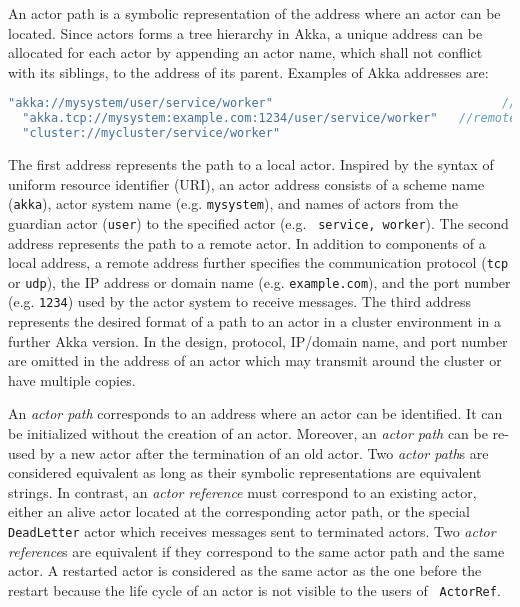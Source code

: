 An actor path is a symbolic representation of the address where an actor can be 
located.  Since actors forms a tree hierarchy in Akka, a unique address can be 
allocated for each actor by appending an actor name, which shall not conflict 
with its siblings, to the address of its parent.   Examples of Akka addresses 
are:

\begin{lstlisting}[language=scala]
  "akka://mysystem/user/service/worker"                                //local
  "akka.tcp://mysystem:example.com:1234/user/service/worker"   //remote
  "cluster://mycluster/service/worker"                                 //cluster
\end{lstlisting}

The first address represents the path to a local actor.  Inspired by the syntax 
of uniform resource identifier (URI), an actor address consists of a 
scheme name ({\tt akka}), actor system name (e.g. {\tt mysystem}), and names of 
actors from the guardian actor ({\tt user}) to the specified actor (e.g. {\tt 
service, worker}).  The second address represents the path to a remote actor.  
In addition to components of a local address, a remote address further 
specifies the communication protocol ({\tt tcp} or {\tt udp}), the IP address 
or domain name (e.g. {\tt example.com}), and the port number (e.g. {\tt 1234}) 
used by the actor system to receive messages. The third address represents the 
desired format of a path to an actor in a cluster environment in a further Akka 
version.  In the design,  protocol, IP/domain name, and port number are omitted 
in the address of an actor which may transmit around the cluster or have 
multiple copies.

An {\it actor path} corresponds to an address where an actor can be identified. 
It can be initialized without the creation of an actor.  Moreover, an {\it 
actor path} can be re-used by a new actor after the termination of an old 
actor.  Two {\it actor path}s are considered equivalent as long as their 
symbolic representations are equivalent strings.  In contrast, an {\it 
actor reference} must correspond to an existing actor, either an alive actor 
located at the corresponding actor path, or the special {\tt DeadLetter} actor 
which receives messages sent to terminated actors.  Two {\it actor reference}s 
are equivalent if they correspond to the same actor path and the same actor.  A 
restarted actor is considered as the same actor as the one before the restart 
because the life cycle of an actor is not visible to the users of {\tt 
ActorRef}.


